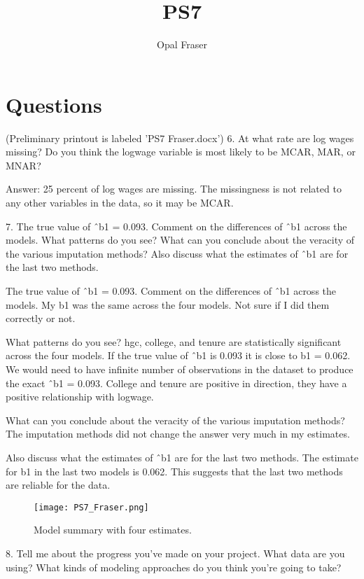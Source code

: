 \documentclass{article}
\title{PS7}
\author{Opal Fraser}
\begin{document}
\maketitle

\section{Questions}
(Preliminary printout is labeled 'PS7 Fraser.docx')
6. At what rate are log wages missing? Do you think the logwage variable is most likely to be MCAR, MAR, or MNAR? 

Answer: 25 percent of log wages are missing. The missingness is not related to any other variables in the data, so it may be MCAR.

7. The true value of ˆb1 = 0.093. Comment on the differences of ˆb1 across the models.
What patterns do you see? What can you conclude about the veracity of the various
imputation methods? Also discuss what the estimates of ˆb1 are for the last two
methods. 

The true value of ˆb1 = 0.093. Comment on the differences of ˆb1 across the models. 
My b1 was the same across the four models. Not sure if I did them correctly or not.

What patterns do you see? hgc, college, and tenure are statistically significant across the four models. If the true value of ˆb1 is 0.093 it is close to b1 = 0.062. We would need to have infinite number of observations in the dataset to produce the exact ˆb1 = 0.093. College and tenure are positive in direction, they have a positive relationship with logwage.

What can you conclude about the veracity of the various imputation methods? 
The imputation methods did not change the answer very much in my estimates. 

Also discuss what the estimates of ˆb1 are for the last two methods. The estimate for b1 in the last two models is 0.062. This suggests that the last two methods are reliable for the data.

\begin{figure}
\centering
\texttt{[image: PS7\_Fraser.png]}
\caption{\label{fig:PS7_Fraser.png} Model summary with four estimates.}
\end{figure}


8. Tell me about the progress you’ve made on your project. What data are you using?
What kinds of modeling approaches do you think you’re going to take?
\end{document}
